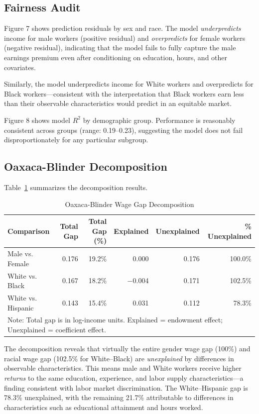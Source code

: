 \documentclass[11pt]{article}
\begin{document}
\subsection{Fairness Audit}

Figure 7 shows prediction residuals by sex and race. The model
\textit{underpredicts} income for male workers (positive residual) and
\textit{overpredicts} for female workers (negative residual), indicating
that the model fails to fully capture the male earnings premium even after
conditioning on education, hours, and other covariates.

Similarly, the model underpredicts income for White workers and
overpredicts for Black workers---consistent with the interpretation that
Black workers earn less than their observable characteristics would
predict in an equitable market.

Figure 8 shows model $R^2$ by demographic group. Performance is reasonably
consistent across groups (range: 0.19--0.23), suggesting the model does not
fail disproportionately for any particular subgroup.

\subsection{Oaxaca-Blinder Decomposition}

Table~\ref{tab:oaxaca} summarizes the decomposition results.

\begin{table}[h!]
\centering
\caption{Oaxaca-Blinder Wage Gap Decomposition}
\label{tab:oaxaca}
\begin{tabular}{lrrrrr}
\toprule
Comparison & Total Gap & Total Gap (\%) & Explained & Unexplained & \% Unexplained \\
\midrule
Male vs. Female & 0.176 & 19.2\% & 0.000 & 0.176 & 100.0\% \\
White vs. Black & 0.167 & 18.2\% & $-$0.004 & 0.171 & 102.5\% \\
White vs. Hispanic & 0.143 & 15.4\% & 0.031 & 0.112 & 78.3\% \\
\bottomrule
\multicolumn{6}{l}{\small Note: Total gap is in log-income units. Explained = endowment effect; Unexplained = coefficient effect.}
\end{tabular}
\end{table}

The decomposition reveals that virtually the entire gender wage gap (100\%) and
racial wage gap (102.5\% for White--Black) are \textit{unexplained} by
differences in observable characteristics. This means male and White workers
receive higher \textit{returns} to the same education, experience, and labor
supply characteristics---a finding consistent with labor market discrimination.
The White--Hispanic gap is 78.3\% unexplained, with the remaining 21.7\%
attributable to differences in characteristics such as educational attainment
and hours worked.
\end{document}
